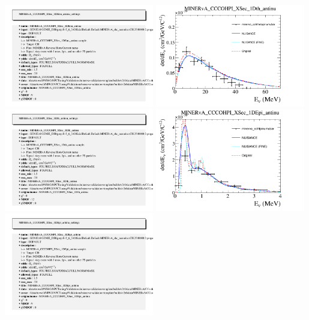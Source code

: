 \documentclass{article}
\begin{document}
\includegraphics[width=0.49\textwidth]{figures/minerva_cohenu_numubar_info.png}
\centering
\includegraphics[width=0.49\textwidth]{figures/minerva_cohthetapinumubar_comp.png}
\includegraphics[width=0.49\textwidth]{figures/minerva_cohthetapinumubar_info.png}
\centering
\includegraphics[width=0.49\textwidth]{figures/minerva_cohtpinumubar_comp.png}
\includegraphics[width=0.49\textwidth]{figures/minerva_cohtpinumubar_info.png}
\end{document}
